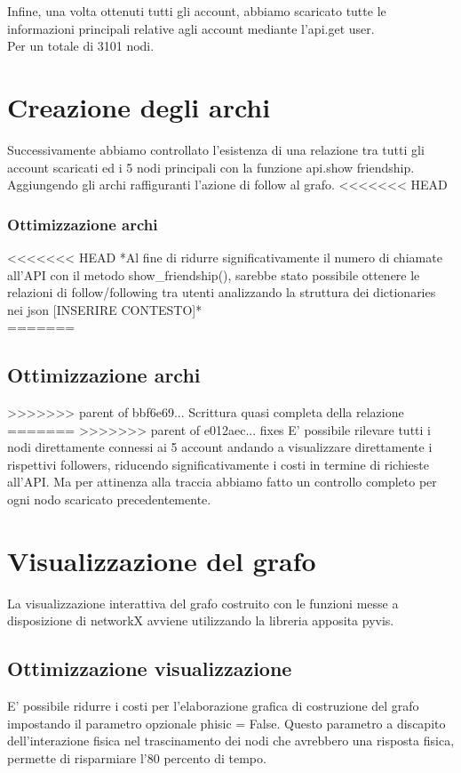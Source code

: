 \documentclass[a4paper,11pt]{report}
\begin{document}
Infine, una volta ottenuti tutti gli account, abbiamo scaricato tutte le informazioni principali relative agli account mediante l'api.get user.\\
Per un totale di 3101 nodi.
\section{Creazione degli archi}
Successivamente abbiamo controllato l'esistenza di una relazione tra tutti gli account scaricati ed i 5 nodi principali con la funzione api.show friendship. Aggiungendo gli archi raffiguranti l'azione di follow al grafo.
<<<<<<< HEAD
\subsubsection{Ottimizzazione archi}
<<<<<<< HEAD
*Al fine di ridurre significativamente il numero di chiamate all'API con il metodo show_friendship(), sarebbe stato possibile ottenere le relazioni di follow/following tra utenti analizzando la struttura dei dictionaries nei json [INSERIRE CONTESTO]*\\
=======
\subsection{Ottimizzazione archi}
>>>>>>> parent of bbf6e69... Scrittura quasi completa della relazione
=======
>>>>>>> parent of e012aec... fixes
E' possibile rilevare tutti i nodi direttamente connessi ai 5 account andando a visualizzare direttamente i rispettivi followers, riducendo significativamente i costi in termine di richieste all'API. Ma per attinenza alla traccia abbiamo fatto un controllo completo per ogni nodo scaricato precedentemente.

\section{Visualizzazione del grafo}
La visualizzazione interattiva del grafo costruito con le funzioni messe a disposizione di networkX avviene utilizzando la libreria apposita pyvis.
\subsection{Ottimizzazione visualizzazione}
E' possibile ridurre i costi per l'elaborazione grafica di costruzione del grafo impostando il parametro opzionale phisic = False. Questo parametro a discapito dell'interazione fisica nel trascinamento  dei nodi che avrebbero una risposta fisica, permette di risparmiare l'80 percento di tempo.
\end{document}
